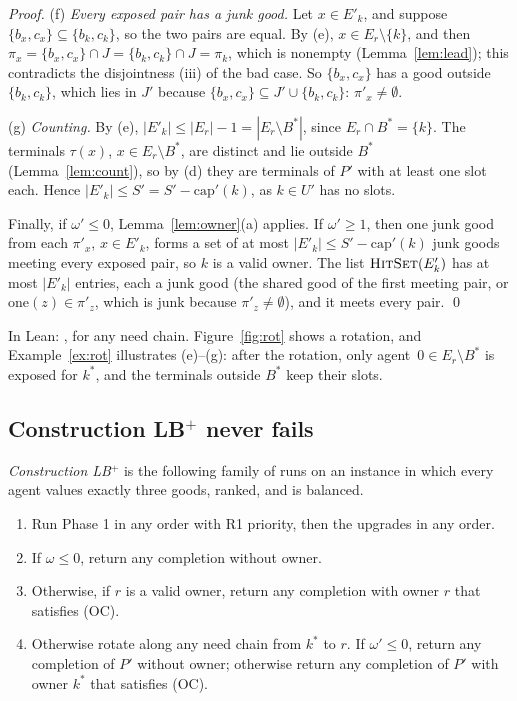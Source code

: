 \documentclass[runningheads,11pt]{llncs}
\newcommand{\LBp}{\texorpdfstring{\mbox{LB$^{+}$}}{LB+}}
\newcommand{\capa}{\mathrm{cap}}
\newcommand{\HitSet}{\textup{\textsc{HitSet}}}
\begin{document}
\begin{proof}
(f) \emph{Every exposed pair has a junk good.} Let $x\in E'_k$, and suppose $\{b_x,c_x\}\subseteq\{b_k,c_k\}$, so the two pairs are equal. By (e), $x\in E_r\setminus\{k\}$, and then $\pi_x=\{b_x,c_x\}\cap J=\{b_k,c_k\}\cap J=\pi_k$, which is nonempty (Lemma~\ref{lem:lead}); this contradicts the disjointness (iii) of the bad case. So $\{b_x,c_x\}$ has a good outside $\{b_k,c_k\}$, which lies in $J'$ because $\{b_x,c_x\}\subseteq J'\cup\{b_k,c_k\}$: $\pi'_x\ne\emptyset$.

(g) \emph{Counting.} By (e), $|E'_k|\le|E_r|-1=|E_r\setminus B^*|$, since $E_r\cap B^*=\{k\}$. The terminals $\tau(x)$, $x\in E_r\setminus B^*$, are distinct and lie outside $B^*$ (Lemma~\ref{lem:count}), so by (d) they are terminals of $P'$ with at least one slot each. Hence $|E'_k|\le S'=S'-\capa'(k)$, as $k\in U'$ has no slots.

Finally, if $\omega'\le0$, Lemma~\ref{lem:owner}(a) applies. If $\omega'\ge1$, then one junk good from each $\pi'_x$, $x\in E'_k$, forms a set of at most $|E'_k|\le S'-\capa'(k)$ junk goods meeting every exposed pair, so $k$ is a valid owner. The list $\HitSet(E'_k)$ has at most $|E'_k|$ entries, each a junk good (the shared good of the first meeting pair, or $\mathrm{one}(z)\in\pi'_z$, which is junk because $\pi'_z\ne\emptyset$), and it meets every pair. \qed
\end{proof}

\noindent In Lean: , for any need chain. Figure~\ref{fig:rot} shows a rotation, and Example~\ref{ex:rot} illustrates (e)--(g): after the rotation, only agent~$0\in E_r\setminus B^*$ is exposed for $k^*$, and the terminals outside $B^*$ keep their slots.

\subsection{Construction \LBp{} never fails}\label{sec:thmC}

\emph{Construction \LBp{}} is the following family of runs on an instance in which every agent values exactly three goods, ranked, and is balanced.
\begin{enumerate}
\item Run Phase 1 in any order with R1 priority, then the upgrades in any order.
\item If $\omega\le0$, return any completion without owner.
\item Otherwise, if $r$ is a valid owner, return any completion with owner $r$ that satisfies (OC).
\item Otherwise rotate along any need chain from $k^*$ to $r$. If $\omega'\le0$, return any completion of $P'$ without owner; otherwise return any completion of $P'$ with owner $k^*$ that satisfies (OC).
\end{enumerate}
\end{document}
